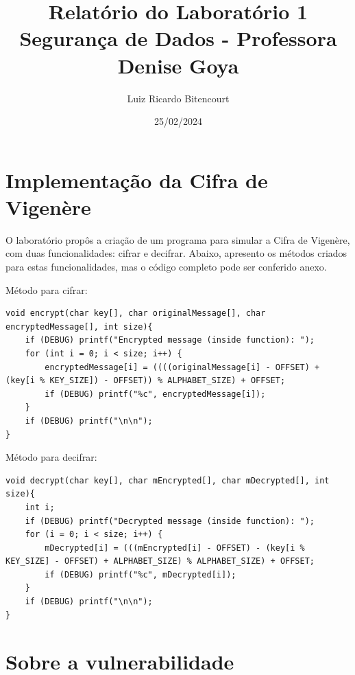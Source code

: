 \documentclass[12pt, a4paper]{article}
\title{Relatório do Laboratório 1 \\ Segurança de Dados - Professora Denise Goya}
\author{Luiz Ricardo Bitencourt}
\date{25/02/2024}
\begin{document}
\maketitle

\section{Implementação da Cifra de Vigenère}
O laboratório propôs a criação de um programa para simular a Cifra de Vigenère, com duas funcionalidades: cifrar e decifrar. 
Abaixo, apresento os métodos criados para estas funcionalidades, mas o código completo pode ser conferido anexo.

Método para cifrar:

\begin{lstlisting}
void encrypt(char key[], char originalMessage[], char encryptedMessage[], int size){
    if (DEBUG) printf("Encrypted message (inside function): ");
    for (int i = 0; i < size; i++) {
        encryptedMessage[i] = ((((originalMessage[i] - OFFSET) + (key[i % KEY_SIZE]) - OFFSET)) % ALPHABET_SIZE) + OFFSET;
        if (DEBUG) printf("%c", encryptedMessage[i]);
    }
    if (DEBUG) printf("\n\n");
}
\end{lstlisting}

Método para decifrar:

\begin{lstlisting}
void decrypt(char key[], char mEncrypted[], char mDecrypted[], int size){
    int i;
    if (DEBUG) printf("Decrypted message (inside function): ");
    for (i = 0; i < size; i++) {
        mDecrypted[i] = (((mEncrypted[i] - OFFSET) - (key[i % KEY_SIZE] - OFFSET) + ALPHABET_SIZE) % ALPHABET_SIZE) + OFFSET;
        if (DEBUG) printf("%c", mDecrypted[i]);
    }
    if (DEBUG) printf("\n\n");
}    
\end{lstlisting}

\section{Sobre a vulnerabilidade}
\end{document}
